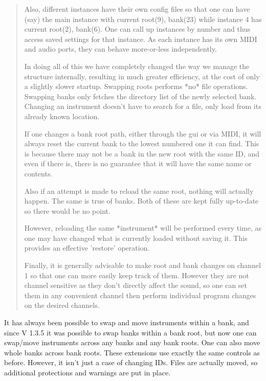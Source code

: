 \begin{quotation}
      Also, different instances have their own config files so that one can
      have (say) the main instance with current root(9), bank(23) while
      instance 4 has current root(2), bank(6). One can call up instances by
      number and thus access saved settings for that instance. As each instance
      has its own MIDI and audio ports, they can behave more-or-less
      independently.

      In doing all of this we have completely changed the way we manage the
      structure internally, resulting in much greater efficiency, at the cost
      of only a slightly slower startup. Swapping roots performs *no* file
      operations. Swapping banks only fetches the directory list of the newly
      selected bank. Changing an instrument doesn't have to search for a file,
      only load from its already known location.

      If one changes a bank root path, either through the gui or via MIDI, it
      will always reset the current bank to the lowest numbered one it can
      find. This is because there may not be a bank in the new root with the
      same ID, and even if there is, there is no guarantee that it will have
      the same name or contents.

      Also if an attempt is made to reload the same root, nothing will actually
      happen. The same is true of banks. Both of these are kept fully
      up-to-date so there would be no point.

      However, reloading the same *instrument* will be performed every time, as
      one may have changed what is currently loaded without saving it. This
      provides an effective 'restore' operation.

      Finally, it is generally advisable to make root and bank changes on
      channel 1 so that one can more easily keep track of them. However they
      are not channel sensitive as they don't directly affect the sound, so one
      can set them in any convenient channel then perform individual program
      changes on the desired channels.
   \end{quotation}

   It has always been possible to swap and move instruments within a bank, and
   since V 1.3.5 it was possible to swap banks within a bank root, but now one can
   swap/move instruments across any banks and any bank roots. One can also move
   whole banks across bank roots.  These extensions use exactly the same controls
   as before. However, it isn't just a case of changing IDs. Files are actually
   moved, so additional protections and warnings are put in place.

